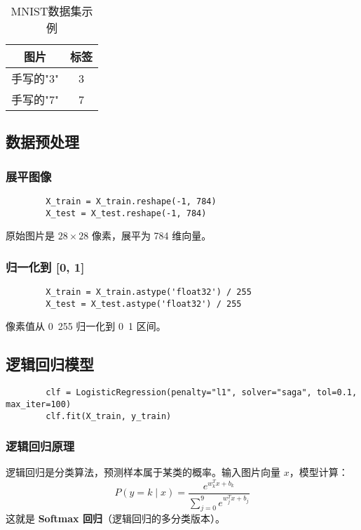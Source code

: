 \documentclass[UTF8]{ctexart}
\begin{document}
	\begin{table}[H]
		\centering
		\begin{tabular}{cc}
			\toprule
			图片 & 标签 \\
			\midrule
			手写的"3" & 3 \\
			手写的"7" & 7 \\
			\bottomrule
		\end{tabular}
		\caption{MNIST数据集示例}
	\end{table}
	
	\subsection{数据预处理}
	\subsubsection{展平图像}
	\begin{lstlisting}
		X_train = X_train.reshape(-1, 784)
		X_test = X_test.reshape(-1, 784)
	\end{lstlisting}
	
	原始图片是 $28 \times 28$ 像素，展平为 784 维向量。
	
	\subsubsection{归一化到 [0, 1]}
	\begin{lstlisting}
		X_train = X_train.astype('float32') / 255
		X_test = X_test.astype('float32') / 255
	\end{lstlisting}
	
	像素值从 0~255 归一化到 0~1 区间。
	
	\subsection{逻辑回归模型}
	\begin{lstlisting}
		clf = LogisticRegression(penalty="l1", solver="saga", tol=0.1, max_iter=100)
		clf.fit(X_train, y_train)
	\end{lstlisting}
	
	\subsubsection{逻辑回归原理}
	逻辑回归是分类算法，预测样本属于某类的概率。输入图片向量 $x$，模型计算：
	\[
	P(y = k \mid x) = \frac{e^{w_k^T x + b_k}}{\sum_{j=0}^9 e^{w_j^T x + b_j}}
	\]
	这就是 \textbf{Softmax 回归}（逻辑回归的多分类版本）。
	
\end{document}
